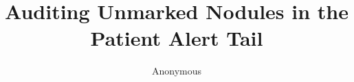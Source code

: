 \documentclass[10pt,twocolumn,letterpaper]{article}
\title{Auditing Unmarked Nodules in the Patient Alert Tail}
\author{Anonymous}
\begin{document}









{
    \small
    
    
}

%
\end{document}
